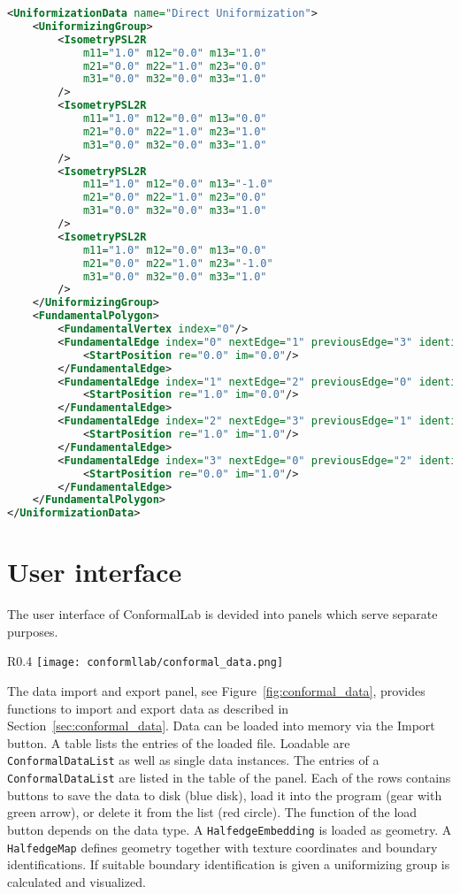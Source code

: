 \documentclass[Thesis.tex]{subfiles}
\begin{document}
\begin{lstlisting}[label=lst:hyperelliptic_xml, caption={A torus given by its uniformizing group and a fundamental polygon. The elements of the group are either euclidean motions or hyperbolic motions given as elements of $\mathbb PSL_2$.}, numbers=none, language=XML, captionpos=b]
<UniformizationData name="Direct Uniformization">
	<UniformizingGroup>
		<IsometryPSL2R 
			m11="1.0" m12="0.0" m13="1.0" 
			m21="0.0" m22="1.0" m23="0.0" 
			m31="0.0" m32="0.0" m33="1.0"
		/>
		<IsometryPSL2R 
			m11="1.0" m12="0.0" m13="0.0" 
			m21="0.0" m22="1.0" m23="1.0" 
			m31="0.0" m32="0.0" m33="1.0"
		/>
		<IsometryPSL2R 
			m11="1.0" m12="0.0" m13="-1.0" 
			m21="0.0" m22="1.0" m23="0.0" 
			m31="0.0" m32="0.0" m33="1.0"
		/>
		<IsometryPSL2R 
			m11="1.0" m12="0.0" m13="0.0" 
			m21="0.0" m22="1.0" m23="-1.0" 
			m31="0.0" m32="0.0" m33="1.0"
		/>
	</UniformizingGroup>
	<FundamentalPolygon>
		<FundamentalVertex index="0"/>
		<FundamentalEdge index="0" nextEdge="1" previousEdge="3" identifiedEdge="2" startVertex="0">
			<StartPosition re="0.0" im="0.0"/>
		</FundamentalEdge>
		<FundamentalEdge index="1" nextEdge="2" previousEdge="0" identifiedEdge="3" startVertex="0">
			<StartPosition re="1.0" im="0.0"/>
		</FundamentalEdge>
		<FundamentalEdge index="2" nextEdge="3" previousEdge="1" identifiedEdge="0" startVertex="0">
			<StartPosition re="1.0" im="1.0"/>
		</FundamentalEdge>
		<FundamentalEdge index="3" nextEdge="0" previousEdge="2" identifiedEdge="1" startVertex="0">
			<StartPosition re="0.0" im="1.0"/>
		</FundamentalEdge>
	</FundamentalPolygon>
</UniformizationData>
\end{lstlisting}



\section{User interface}
\label{sec:conformallab_ui}

The user interface of {\sc ConformalLab} is devided into panels which serve
separate purposes.
\begin{wrapfigure}{R}{0.4\textwidth}
\centering
\texttt{[image: conformllab/conformal\_data.png]}
\caption{XML data import and export interface of {\sc ConformalLab}.}
\label{fig:conformal_data}
\end{wrapfigure}
The data import and export panel, see Figure~\ref{fig:conformal_data},
provides functions to import and export data as described in Section~\ref{sec:conformal_data}.
Data can be loaded into memory via the Import button. A table lists the entries of the loaded file.
Loadable are {\tt ConformalDataList} as well as single data instances. The entries of a
{\tt ConformalDataList} are listed in the table of the panel. Each of the rows contains buttons
to save the data to disk (blue disk), load it into the program (gear with green arrow), or delete 
it from the list (red circle).
The function of the load button depends on the data type. A {\tt HalfedgeEmbedding} is
loaded as geometry. A {\tt HalfedgeMap} defines geometry together with texture coordinates
and boundary identifications. If suitable boundary identification is given a uniformizing
group is calculated and visualized.
\end{document}
